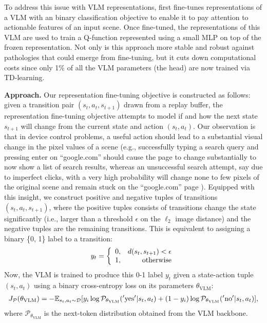 To address this issue with VLM representations, \ourmethod{} first fine-tunes representations of a VLM with an binary classification objective to enable it to pay attention to actionable features of an input scene. Once fine-tuned, the representations of this VLM are used to train a Q-function represented using a small MLP on top of the frozen representation. Not only is this approach more stable and robust against pathologies that could emerge from fine-tuning, but it cuts down computational costs since only 1\% of all the VLM parameters (the head) are now trained via TD-learning.

\textbf{Approach.} Our representation fine-tuning objective is constructed as follows: given a transition pair $(s_t, a_t, s_{t+1})$ drawn from a replay buffer, the representation fine-tuning  objective attempts to model if and how the next state $s_{t+1}$ will change from the current state and action $(s_t,a_t)$. Our observation is that in device control problems, a useful action should lead to a substantial visual change in the pixel values of a scene (e.g., successfully typing a search query and pressing enter on ``google.com'' should cause the page to change substantially to now show a list of search results, whereas an unsuccessful search attempt, say due to imperfect clicks, with a very high probability will change none to few pixels of the original scene and remain stuck on the ``google.com'' page ). Equipped with this insight, we construct positive and negative tuples of transitions $(s_t, a_t, s_{t+1})$, where the positive tuples consists of transitions change the state significantly (i.e., larger than a threshold $\epsilon$ on the $\ell_2$ image distance) and the negative tuples are the remaining transitions. This is equivalent to assigning a binary \{0, 1\} label to a transition:
\begin{align*}
\vspace{-2mm}
y_t = \left\{
  \begin{array}{lr} 
      0, & d(s_t, s_{t+1}) < \epsilon \\
      1, & \mathrm{otherwise}
      \end{array}
\right.
\vspace{-2mm}
\end{align*}
Now, the VLM is trained to produce this 0-1 label $y_t$ given a state-action tuple $(s_t, a_t)$ using a binary cross-entropy loss on its parameters $\theta_{\mathrm{VLM}}$:
\begin{align}
        J_{\mathcal{P}}(\theta_{\mathrm{VLM}}) = -\mathbb{E}_{s_t, a_t \sim \mathcal{D}}[y_i \log \mathcal{P}_{\theta_{\mathrm{VLM}}}(\mathrm{'yes'}|s_t, a_t) + (1 - y_i)\log \mathcal{P}_{\theta_{\mathrm{VLM}}}(\mathrm{'no'}|s_t, a_t)  ], \label{equation:vlm}
\end{align}
where $\mathcal{P}_{\theta_{\mathrm{VLM}}}$ is the next-token distribution obtained from the VLM backbone. 

